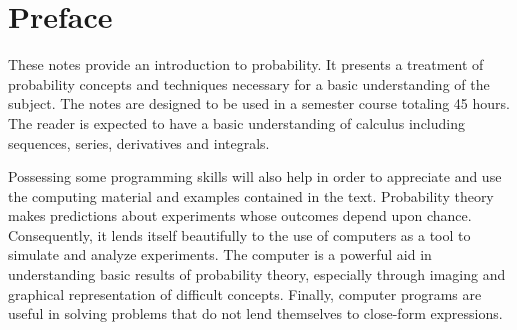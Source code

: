 \chapter*{Preface}

These notes provide an introduction to probability.
It presents a treatment of probability concepts and techniques necessary for a basic understanding of the subject.
The notes are designed to be used in a semester course totaling 45 hours.
The reader is expected to have a basic understanding of calculus including sequences, series, derivatives and integrals.

Possessing some programming skills will also help in order to appreciate and use the computing material and examples contained in the text.
Probability theory makes predictions about experiments whose outcomes depend upon chance.
Consequently, it lends itself beautifully to the use of computers as a tool to simulate and analyze experiments.
The computer is a powerful aid in understanding basic results of probability theory, especially through imaging and graphical representation of difficult concepts.
Finally, computer programs are useful in solving problems that do not lend themselves to close-form expressions.

